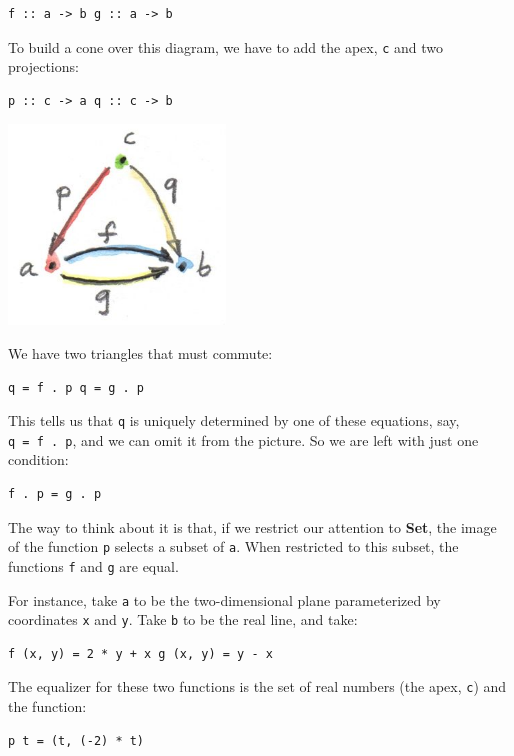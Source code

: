 \begin{verbatim}
f :: a -> b g :: a -> b
\end{verbatim}

To build a cone over this diagram, we have to add the apex, \texttt{c}
and two projections:

\begin{verbatim}
p :: c -> a q :: c -> b
\end{verbatim}

\includegraphics[width=2.27083in]{images/equalizercone.jpg}

We have two triangles that must commute:

\begin{verbatim}
q = f . p q = g . p
\end{verbatim}

This tells us that \texttt{q} is uniquely determined by one of these
equations, say, \texttt{q\ =\ f\ .\ p}, and we can omit it from the
picture. So we are left with just one condition:

\begin{verbatim}
f . p = g . p
\end{verbatim}

The way to think about it is that, if we restrict our attention to
\textbf{Set}, the image of the function \texttt{p} selects a subset of
\texttt{a}. When restricted to this subset, the functions \texttt{f} and
\texttt{g} are equal.

For instance, take \texttt{a} to be the two-dimensional plane
parameterized by coordinates \texttt{x} and \texttt{y}. Take \texttt{b}
to be the real line, and take:

\begin{verbatim}
f (x, y) = 2 * y + x g (x, y) = y - x
\end{verbatim}

The equalizer for these two functions is the set of real numbers (the
apex, \texttt{c}) and the function:

\begin{verbatim}
p t = (t, (-2) * t)
\end{verbatim}

